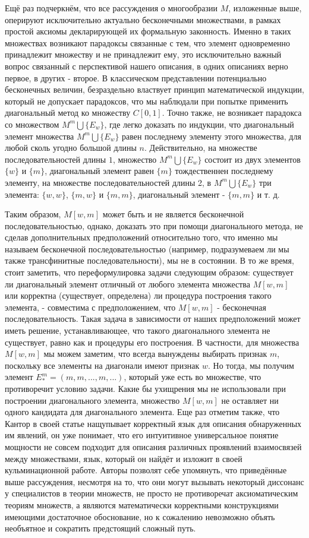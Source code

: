\documentclass[12pt]{article}
\begin{document}
Ещё раз подчеркнём, что все рассуждения о многообразии $M$, изложенные выше, оперируют исключительно актуально бесконечными множествами, в рамках простой аксиомы декларирующей их формальную законность. Именно в таких множествах возникают парадоксы связанные с тем, что элемент одновременно принадлежит множеству и не принадлежит ему, это исключительно важный вопрос связанный с перспективой нашего описания, в одних описаниях верно первое, в других - второе. В классическом представлении потенциально бесконечных величин, безраздельно властвует принцип математической индукции, который не допускает парадоксов, что мы наблюдали при попытке применить диагональный метод ко множеству $C[0, 1]$. Точно также, не возникает парадокса со множеством $M^m \bigcup \{E_w\}$, где легко доказать по индукции, что диагональный элемент множества $M^m \bigcup \{E_w\}$ равен последнему элементу этого множества, для любой сколь угодно большой длины $n$. Действительно, на множестве последовательностей длины $1$, множество $M^m \bigcup \{E_w\}$ состоит из двух элементов $\{w\}$ и $\{m\}$, диагональный элемент равен $\{m\}$ тождественнен последнему элементу, на множестве последовательностей длины 2, в $M^m \bigcup \{E_w\}$ три элемента: $\{w, w\}$, $\{m, w\}$ и $\{m, m\}$, диагональный элемент - $\{m, m\}$ и т. д.

Таким образом, $M[w, m]$ может быть и не является бесконечной последовательностью, однако, доказать это при помощи диагонального метода, не сделав дополнительных предположений относительно того, что именно мы называем бесконечной последовательностью (например, подразумеваем ли мы также трансфинитные последовательности), мы не в состоянии. В то же время, стоит заметить, что переформулировка задачи следующим образом: существует ли диагональный элемент отличный от любого элемента множества $M[w, m]$ или корректна (существует, определена) ли процедура построения такого элемента, - совместима с предположением, что $M[w, m]$ - бесконечная последовательность. Такая задача в зависимости от наших предположений может иметь решение, устанавливающее, что такого диагонального элемента не существует, равно как и процедуры его построения. В частности, для множества $M[w, m]$ мы можем заметим, что всегда вынуждены выбирать признак $m$, поскольку все элементы на диагонали имеют признак $w$. Но тогда, мы получим элемент $E^m_* = (m, m, ..., m, ...)$, который уже есть во множестве, что противоречит условию задачи. Какие бы ухищрения мы не использовали при построении диагонального элемента, множество $M[w, m]$ не оставляет ни одного кандидата для диагонального элемента. Еще раз отметим также, что Кантор в своей статье нащупывает корректный язык для описания обнаруженных им явлений, он уже понимает, что его интуитивное универсальное понятие мощности не совсем подходит для описания различных проявлений взаимосвязей между множествами, язык, который он найдёт и изложит в своей кульминационной работе. Авторы позволят себе упомянуть, что приведённые выше рассуждения, несмотря на то, что они могут вызывать некоторый диссонанс у специалистов в теории множеств, не просто не противоречат аксиоматическим теориям множеств, а являются математически корректными конструкциями имеющими достаточное обоснование, но к сожалению невозможно объять необъятное и сократить предстоящий сложный путь. 
\end{document}
